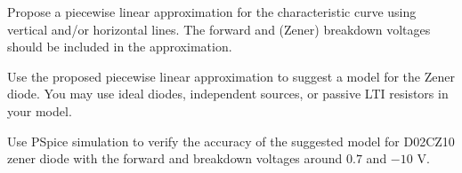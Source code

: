\documentclass[11pt]{article}
\begin{document}
\begin{question}

\begin{subquestion}{Propose a piecewise linear approximation for the characteristic curve using vertical and/or horizontal lines. The forward and (Zener) breakdown voltages should be included in the approximation. }

\answer{}

\end{subquestion}

\begin{subquestion}{Use the proposed piecewise linear approximation to suggest a model for the Zener diode. You may use ideal diodes, independent sources, or passive LTI resistors in your model. }

\answer{}

\end{subquestion}

\begin{subquestion}{Use PSpice simulation to verify the accuracy of the suggested model for D02CZ10 zener diode with the forward and breakdown voltages around $0.7$ and $-10$ V. }

\answer{}

\end{subquestion}

\end{question}




\begin{question}


\end{question}

\end{document}
